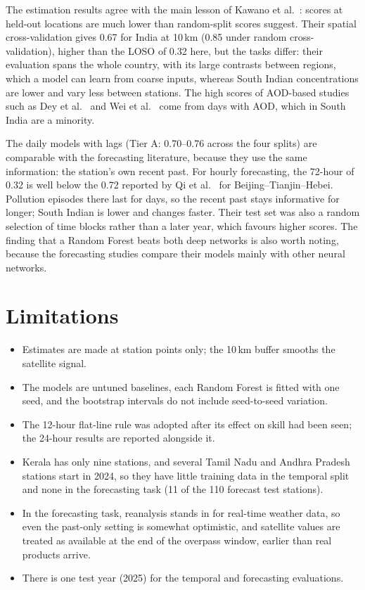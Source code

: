 The estimation results agree with the main lesson of Kawano et al.\ \cite{kawano2025india}: scores at
held-out locations are much lower than random-split scores suggest. Their spatial cross-validation
gives \rsq{} 0.67 for India at 10\,km (0.85 under random cross-validation), higher than the LOSO
\rsq{} of 0.32 here, but the tasks differ:
their evaluation spans the whole country, with its large contrasts between regions, which a model
can learn from coarse inputs, whereas South Indian concentrations are lower and vary less between
stations.
The high scores of AOD-based studies such as Dey et al.\ \cite{dey2020india} and Wei et al.\
\cite{wei2020stet} come from days with AOD, which in South India are a minority.

The daily models with lags (Tier A: \rsq{} 0.70--0.76 across the four splits) are comparable with
the forecasting literature, because they use the same information: the station's own recent past. For
hourly forecasting, the 72-hour \rsq{} of 0.32 is well below the 0.72 reported by Qi et al.\
\cite{qi2019gclstm} for Beijing--Tianjin--Hebei. Pollution episodes there last for days, so the
recent past stays informative for longer; South Indian \pmtf{} is lower and changes faster. Their
test set was also a random selection of time blocks rather than a later year, which favours higher
scores. The
finding that a Random Forest beats both deep networks is also worth noting, because the
forecasting studies compare their models mainly with other neural networks.

\section{Limitations}

\begin{itemize}
  \item Estimates are made at station points only; the 10\,km buffer smooths the satellite signal.
  \item The models are untuned baselines, each Random Forest is fitted with one seed, and the
        bootstrap intervals do not include seed-to-seed variation.
  \item The 12-hour flat-line rule was adopted after its effect on skill had been seen; the 24-hour
        results are reported alongside it.
  \item Kerala has only nine stations, and several Tamil Nadu and Andhra Pradesh stations start in
        2024, so they have little training data in the temporal split and none in the forecasting
        task (11 of the 110 forecast test stations).
  \item In the forecasting task, reanalysis stands in for real-time weather data, so even the
        past-only setting is somewhat optimistic, and satellite values are treated as available at
        the end of the overpass window, earlier than real products arrive.
  \item There is one test year (2025) for the temporal and forecasting evaluations.
\end{itemize}

